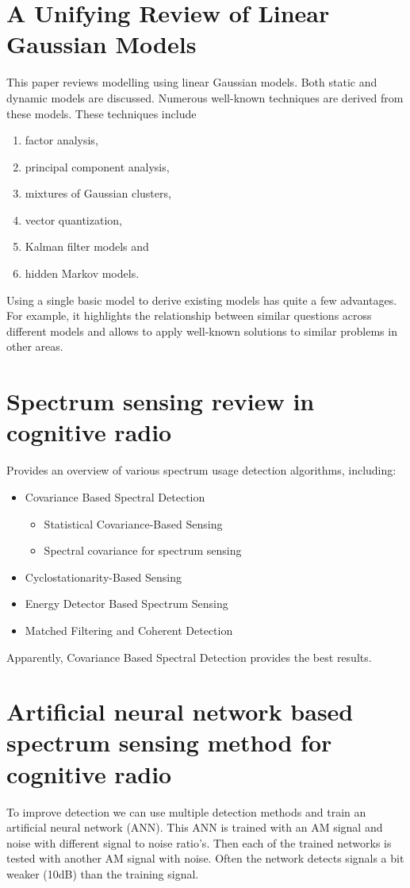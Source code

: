 \documentclass[report, oneside, a4paper, openany]{memoir}
\begin{document}
\section{A Unifying Review of Linear Gaussian Models \cite{roweis1999gaussian}}
This paper reviews modelling using linear Gaussian models. Both static and dynamic models are discussed. Numerous well-known techniques are derived from these models. These techniques include
\begin{enumerate}
	\item factor analysis,
	\item principal component analysis,
	\item mixtures of Gaussian clusters,
	\item vector quantization,
	\item Kalman filter models and
	\item hidden Markov models.
\end{enumerate}
Using a single basic model to derive existing models has quite a few advantages. For example, it highlights the relationship between similar questions across different models and allows to apply well-known solutions to similar problems in other areas.
\section{Spectrum sensing review in cognitive radio \cite{seshukumar2013spectrum}}
Provides an overview of various spectrum usage detection algorithms, including:
\begin{itemize}
	\item Covariance Based Spectral Detection
	\begin{itemize}
		\item Statistical Covariance-Based Sensing
		\item Spectral covariance for spectrum sensing
	\end{itemize}
	\item Cyclostationarity-Based Sensing
	\item Energy Detector Based Spectrum Sensing
	\item Matched Filtering and Coherent Detection
\end{itemize}
Apparently, Covariance Based Spectral Detection provides the best results.
\section{Artificial neural network based spectrum sensing method for cognitive radio \cite{tang2010artificial}}
%
To improve detection we can use multiple detection methods and train an artificial neural network (ANN). This ANN is trained with an AM signal and noise with different signal to noise ratio's. Then each of the trained networks is tested with another AM signal with noise. Often the network detects signals a bit weaker (10dB) than the training signal.
\end{document}

